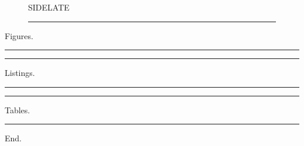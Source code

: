 \documentclass[a4paper]{memoir}
\begin{document}
\begin{figure}[p]
  \begin{sidecaption}{SIDELATE}
    \rule{4cm}{4cm}
  \end{sidecaption}
\end{figure}
Figures. \lipsum[1][1-3]
\begin{marginfigure}\rule{2cm}{5mm}\caption{MARGINONE}\end{marginfigure}
\clearpage
\begin{listing}[p]
  \centering\rule{4cm}{4cm}\caption{LISTLATE}
\end{listing}
Listings. \lipsum[2][1-3]
\begin{listing}[H]
  \centering\rule{2cm}{5mm}\caption{LISTHERE}
\end{listing}
\clearpage
\begin{table}[p]
  \centering\rule{4cm}{4cm}\caption{TABLATE}
\end{table}
Tables. \lipsum[3][1-3]
\begin{table}[H]
  \centering\rule{2cm}{5mm}\caption{TABHERE}
\end{table}
\clearpage
End.
\end{document}
